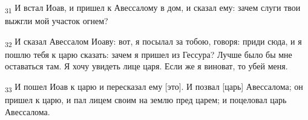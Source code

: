 \begin{tcolorbox}
\textsubscript{31} И встал Иоав, и пришел к Авессалому в дом, и сказал ему: зачем слуги твои выжгли мой участок огнем?
\end{tcolorbox}
\begin{tcolorbox}
\textsubscript{32} И сказал Авессалом Иоаву: вот, я посылал за тобою, говоря: приди сюда, и я пошлю тебя к царю сказать: зачем я пришел из Гессура? Лучше было бы мне оставаться там. Я хочу увидеть лице царя. Если же я виноват, то убей меня.
\end{tcolorbox}
\begin{tcolorbox}
\textsubscript{33} И пошел Иоав к царю и пересказал ему [это]. И позвал [царь] Авессалома; он пришел к царю, и пал лицем своим на землю пред царем; и поцеловал царь Авессалома.
\end{tcolorbox}
